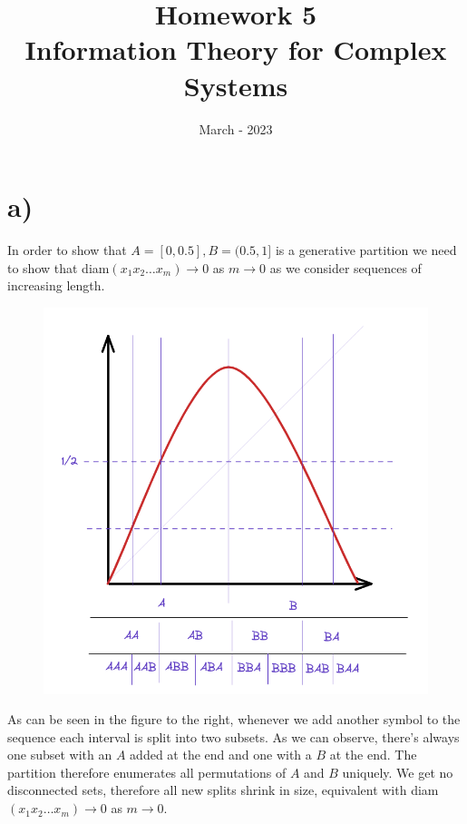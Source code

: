 \documentclass[a4paper, 12pt]{article}
\begin{document}
\title{\vspace{-6em}\textbf{Homework 5}\\ \Large Information Theory for Complex Systems \vspace{-3.2em} }
\author{} \date{March - 2023}

\maketitle


\section*{a)}
In order to show that $A = [0, 0.5], B = (0.5,1]$ is a generative partition we need to show that diam$(x_1 x_2 \dots x_m) \rightarrow 0$ as $m \rightarrow 0$ as we consider sequences of increasing length.

\begin{figure}
    \includegraphics[width=\linewidth,trim={0 2cm 0 2cm}]{map.png}
\end{figure}

As can be seen in the figure to the right, whenever we add another symbol to the sequence each interval is split into two subsets. As we can observe, there's always one subset with an $A$ added at the end and one with a $B$ at the end. The partition therefore enumerates all permutations of $A$ and $B$ uniquely. We get no disconnected sets, therefore all new splits shrink in size, equivalent with diam$(x_1 x_2 \dots x_m) \rightarrow 0$ as $m \rightarrow 0$.
\end{document}
